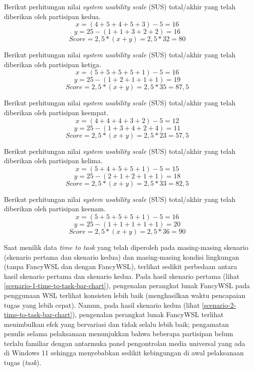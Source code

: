 Berikut perhitungan nilai \textit{system usability scale} (SUS) total/akhir yang telah diberikan oleh partisipan kedua.
\[x = (4 + 5 + 4 + 5 + 3) - 5 = 16\]
\[y = 25 - (1 + 1 + 3 + 2 + 2) = 16\]
\[Score = 2,5 * (x + y) = 2,5 * 32 = 80\]

Berikut perhitungan nilai \textit{system usability scale} (SUS) total/akhir yang telah diberikan oleh partisipan ketiga.
\[x = (5 + 5 + 5 + 5 + 1) - 5 = 16\]
\[y = 25 - (1 + 2 + 1 + 1 + 1) = 19\]
\[Score = 2,5 * (x + y) = 2,5 * 35 = 87,5\]

Berikut perhitungan nilai \textit{system usability scale} (SUS) total/akhir yang telah diberikan oleh partisipan keempat.
\[x = (4 + 4 + 4 + 3 + 2) - 5 = 12\]
\[y = 25 - (1 + 3 + 4 + 2 + 4) = 11\]
\[Score = 2,5 * (x + y) = 2,5 * 23 = 57,5\]

Berikut perhitungan nilai \textit{system usability scale} (SUS) total/akhir yang telah diberikan oleh partisipan kelima.
\[x = (5 + 4 + 5 + 5 + 1) - 5 = 15\]
\[y = 25 - (2 + 1 + 2 + 1 + 1) = 18\]
\[Score = 2,5 * (x + y) = 2,5 * 33 = 82,5\]

Berikut perhitungan nilai \textit{system usability scale} (SUS) total/akhir yang telah diberikan oleh partisipan keenam.
\[x = (5 + 5 + 5 + 5 + 1) - 5 = 16\]
\[y = 25 - (1 + 1 + 1 + 1 + 1) = 20\]
\[Score = 2,5 * (x + y) = 2,5 * 36 = 90\]

Saat menilik data \textit{time to task} yang telah diperoleh pada masing-masing skenario (skenario pertama dan skenario kedua) dan masing-masing kondisi lingkungan (tanpa FancyWSL dan dengan FancyWSL), terlihat sedikit perbedaan antara hasil skenario pertama dan skenario kedua. Pada hasil skenario pertama (lihat \autoref{scenario-1-time-to-task-bar-chart}), pengenalan perangkat lunak FancyWSL pada penggunaan WSL terlihat konsisten lebih baik (menghasilkan waktu pencapaian tugas yang lebih cepat). Namun, pada hasil skenario kedua (lihat \autoref{scenario-2-time-to-task-bar-chart}), pengenalan perangkat lunak FancyWSL terlihat menimbulkan efek yang bervariasi dan tidak selalu lebih baik; pengamatan penulis selama pelaksanaan menunjukkan bahwa beberapa partisipan belum terlalu familiar dengan antarmuka panel pengontrolan media universal yang ada di Windows 11 sehingga menyebabkan sedikit kebingungan di awal pelaksanaan tugas (\textit{task}).

